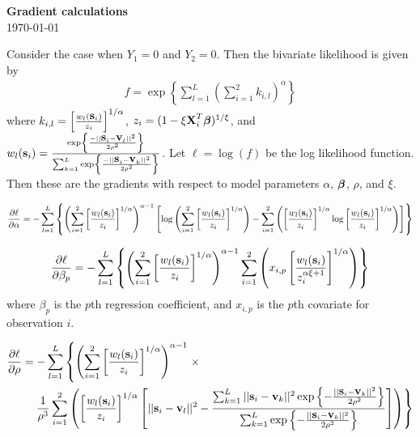 \documentclass[11pt]{article}
\begin{document}
\linenumbers

\begin{center}
{\Large {\bf Gradient calculations}}\\
\today
\end{center}

Consider the case when $Y_1 = 0$ and $Y_2 = 0$.
Then the bivariate likelihood is given by
\begin{align}
  f = \exp \left\{ \sum_{l = 1}^L \left( \sum_{i = 1}^2  k_{i, l} \right)^\alpha \right\}
\end{align}
where $k_{i, l} = \left[ \frac{ w_l(\mbox{\bf s}_i)}{z_i} \right]^{1 / \alpha}$, $z_i = (1 - \xi \mbox{\bf X}^T_i \mbox{\boldmath $\beta$})^{1 / \xi}$, and $w_l(\mbox{\bf s}_i) = \frac{ \exp \left\{ \frac{- ||\mbox{\bf s}_i - \mbox{\bf v}_l||^2}{2 \rho^2} \right\} }{\sum_{k = 1}^L \exp \left\{ \frac{- ||\mbox{\bf s}_i - \mbox{\bf v}_k||^2}{2 \rho^2} \right\} }$.
Let $\ell = \log(f)$ be the log likelihood function.
Then these are the gradients with respect to model parameters $\alpha$, $\mbox{\boldmath $\beta$}$, $\rho$, and $\xi$.

\begin{align}
  \frac{\partial \ell}{\partial \alpha} = -\sum _{l=1}^{L} \left\{
    \left( \sum_{i = 1}^2  \left[ \frac{ w_l(\mbox{\bf s}_i)}{z_i} \right]^{1 / \alpha} \right)^{\alpha - 1}
    \left[
      \log \left( \sum_{i = 1}^2  \left[ \frac{ w_l(\mbox{\bf s}_i)}{z_i} \right]^{1 / \alpha} \right)
      -\sum_{i = 1}^2 \left(
        \left[ \frac{ w_l(\mbox{\bf s}_i)}{z_i} \right]^{1 / \alpha} \log  \left[ \frac{ w_l(\mbox{\bf s}_i)}{z_i} \right]^{1 / \alpha}
      \right)
    \right]
  \right\}
\end{align}

\begin{align}
  \frac{\partial \ell}{ \partial \beta_p } = -\sum _{l=1}^{L} \left\{
    \left( \sum_{i = 1}^2  \left[ \frac{ w_l(\mbox{\bf s}_i)}{z_i} \right]^{1 / \alpha} \right)^{\alpha - 1}
    \sum_{i = 1}^2 \left( x_{i, p}  \left[ \frac{ w_l(\mbox{\bf s}_i)}{z_i^{\alpha \xi + 1}} \right]^{1 / \alpha} \right)
  \right\}
\end{align}
where $\beta_p$ is the $p$th regression coefficient, and $x_{i, p}$ is the $p$th covariate for observation $i$.

\begin{align}
  \frac{ \partial \ell}{ \partial \rho } &= -\sum _{l=1}^{L} \left\{
    \left( \sum_{i = 1}^2 \left[ \frac{ w_l(\mbox{\bf s}_i) }{z_i} \right]^{1 / \alpha} \right)^{\alpha - 1} \right. \times \nonumber \\
    & \quad \left. \frac{ 1 }{\rho^3} \sum_{i = 1}^2
    \left( \left[ \frac{ w_l(\mbox{\bf s}_i)}{z_i} \right]^{1 / \alpha}
      \left[ ||\mbox{\bf s}_i - \mbox{\bf v}_l||^{2} -
        \frac{ \sum_{k=1}^{L} ||\mbox{\bf s}_i - \mbox{\bf v}_k||^{2} \exp \left \{ -\frac{ ||\mbox{\bf s}_i - \mbox{\bf v}_k||^{2} }{2\rho^{2}} \right\}}
             { \sum_{k=1}^{L} \exp \left\{ - \frac{ ||\mbox{\bf s}_i - \mbox{\bf v}_k||^{2} }{ 2 \rho^{2} } \right\} }
      \right]
    \right)
  \right\}
\end{align}
\end{document}
